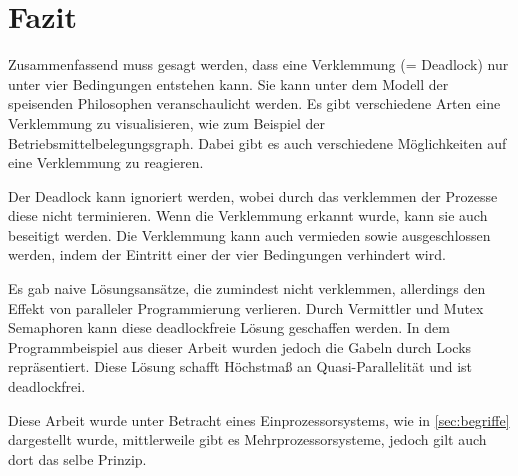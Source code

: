 \chapter{Fazit}
\label{fazit}

Zusammenfassend muss gesagt werden, dass eine Verklemmung (= Deadlock) nur unter vier Bedingungen entstehen kann. Sie kann unter dem Modell der speisenden Philosophen veranschaulicht werden. Es gibt verschiedene Arten eine Verklemmung zu visualisieren, wie zum Beispiel der Betriebsmittelbelegungsgraph. Dabei gibt es auch verschiedene Möglichkeiten auf eine Verklemmung zu reagieren. 

Der Deadlock kann ignoriert werden, wobei durch das verklemmen der Prozesse diese nicht terminieren.
Wenn die Verklemmung erkannt wurde, kann sie auch beseitigt werden.
Die Verklemmung kann auch vermieden sowie ausgeschlossen werden, indem der Eintritt einer der vier Bedingungen verhindert wird.

Es gab naive Lösungsansätze, die zumindest nicht verklemmen, allerdings den Effekt von paralleler Programmierung verlieren. 
Durch Vermittler und Mutex Semaphoren kann diese deadlockfreie Lösung geschaffen werden. 
In dem Programmbeispiel aus dieser Arbeit wurden jedoch die Gabeln durch Locks repräsentiert. Diese Lösung schafft Höchstmaß an Quasi-Parallelität und ist deadlockfrei. 

Diese Arbeit wurde unter Betracht eines Einprozessorsystems, wie in \ref{sec:begriffe}  dargestellt wurde, mittlerweile gibt es Mehrprozessorsysteme, jedoch gilt auch dort das selbe Prinzip.